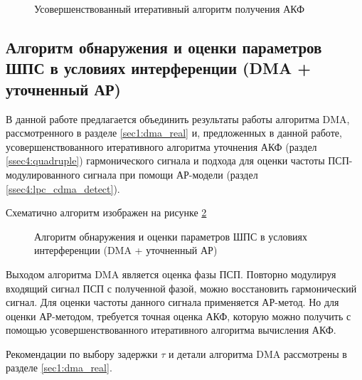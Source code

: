 \begin{figure}[H]
	\center{}
	\caption{Усовершенствованный итеративный алгоритм получения АКФ}
	\label{pic:akf_pic}
\end{figure}

\subsection{Алгоритм обнаружения и оценки параметров ШПС в условиях интерференции (DMA + уточненный АР)}
\label{sec4:dma_lpc_algo}

В данной работе предлагается объединить результаты работы алгоритма DMA, рассмотренного в разделе
\ref{sec1:dma_real} и, предложенных в данной работе, усовершенствованного итеративного 
алгоритма уточнения АКФ (раздел \ref{ssec4:quadruple}) гармонического сигнала и 
подхода для оценки частоты ПСП-модулированного сигнала при помощи АР-модели (раздел \ref{ssec4:lpc_cdma_detect}).

Схематично алгоритм изображен на рисунке \ref{pic4:dma_quadruple_lpc}

\begin{figure}[H]
\center{}
	\caption{Алгоритм обнаружения и оценки параметров ШПС в условиях интерференции (DMA + уточненный АР)}
	\label{pic4:dma_quadruple_lpc}
\end{figure}

Выходом алгоритма DMA является оценка фазы ПСП. Повторно модулируя входящий сигнал ПСП с полученной
фазой, можно восстановить гармонический сигнал. Для оценки частоты данного сигнала применяется
АР-метод. Но для оценки АР-методом, требуется точная оценка АКФ, которую можно получить
с помощью усовершенствованного итеративного алгоритма вычисления АКФ.

Рекомендации по выбору задержки ${\tau}$ и детали алгоритма DMA рассмотрены в разделе
\ref{sec1:dma_real}.

